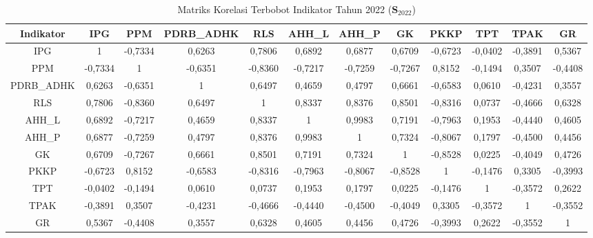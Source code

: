 \begin{table}[H]
\centering
\caption{Matriks Korelasi Terbobot Indikator Tahun 2022 ($\mathbf{S}_{2022}$)} \label{tab:app1matriks_intra_loading_2022}
\begin{adjustbox}{max width=\textwidth, max height=0.85\textheight}
\begin{tabular}{|c|c|c|c|c|c|c|c|c|c|c|c|}
\hline
\textbf{Indikator} & \textbf{IPG} & \textbf{PPM} & \textbf{PDRB\_ADHK} & \textbf{RLS} & \textbf{AHH\_L} & \textbf{AHH\_P} & \textbf{GK} & \textbf{PKKP} & \textbf{TPT} & \textbf{TPAK} & \textbf{GR} \\
\hline
IPG & 1 & -0,7334 & 0,6263 & 0,7806 & 0,6892 & 0,6877 & 0,6709 & -0,6723 & -0,0402 & -0,3891 & 0,5367 \\
PPM & -0,7334 & 1 & -0,6351 & -0,8360 & -0,7217 & -0,7259 & -0,7267 & 0,8152 & -0,1494 & 0,3507 & -0,4408 \\
PDRB\_ADHK & 0,6263 & -0,6351 & 1 & 0,6497 & 0,4659 & 0,4797 & 0,6661 & -0,6583 & 0,0610 & -0,4231 & 0,3557 \\
RLS & 0,7806 & -0,8360 & 0,6497 & 1 & 0,8337 & 0,8376 & 0,8501 & -0,8316 & 0,0737 & -0,4666 & 0,6328 \\
AHH\_L & 0,6892 & -0,7217 & 0,4659 & 0,8337 & 1 & 0,9983 & 0,7191 & -0,7963 & 0,1953 & -0,4440 & 0,4605 \\
AHH\_P & 0,6877 & -0,7259 & 0,4797 & 0,8376 & 0,9983 & 1 & 0,7324 & -0,8067 & 0,1797 & -0,4500 & 0,4456 \\
GK & 0,6709 & -0,7267 & 0,6661 & 0,8501 & 0,7191 & 0,7324 & 1 & -0,8528 & 0,0225 & -0,4049 & 0,4726 \\
PKKP & -0,6723 & 0,8152 & -0,6583 & -0,8316 & -0,7963 & -0,8067 & -0,8528 & 1 & -0,1476 & 0,3305 & -0,3993 \\
TPT & -0,0402 & -0,1494 & 0,0610 & 0,0737 & 0,1953 & 0,1797 & 0,0225 & -0,1476 & 1 & -0,3572 & 0,2622 \\
TPAK & -0,3891 & 0,3507 & -0,4231 & -0,4666 & -0,4440 & -0,4500 & -0,4049 & 0,3305 & -0,3572 & 1 & -0,3552 \\
GR & 0,5367 & -0,4408 & 0,3557 & 0,6328 & 0,4605 & 0,4456 & 0,4726 & -0,3993 & 0,2622 & -0,3552 & 1 \\
\hline
\end{tabular}
\end{adjustbox}
\end{table}